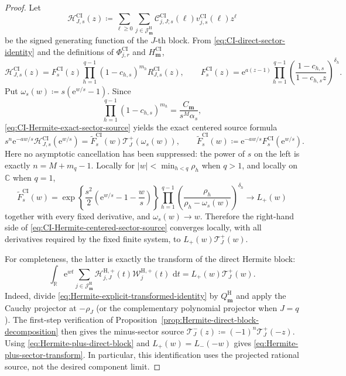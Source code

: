 \documentclass[10pt]{amsart}
\newcommand{\e}{\mathrm e}
\newcommand{\dd}{\,\mathrm d}
\newcommand{\mm}{\boldsymbol m}
\newcommand{\abs}[1]{\lvert#1\rvert}
\theoremstyle{plain}
\theoremstyle{definition}
\theoremstyle{remark}
\begin{document}
\begin{proof}
Let
\[
 \mathcal H_{J,s}^{\mathrm{CI}}(z)\coloneq
 \sum_{\ell\ge0}\sum_{j\in\mathcal J_{\mm}^{\mathrm H}}
 \mathscr C_{j,J;s}^{\mathrm{CI}}(\ell)
 v_{j,s}^{\mathrm{CI}}(\ell)z^\ell
\]
be the signed generating function of the \(J\)-th block.  From
\eqref{eq:CI-direct-sector-identity} and the definitions of
\(\Phi_{j,r}^{\mathrm{CI}}\) and \(H_{\mm}^{\mathrm{CI}}\),
\[
 \mathcal H_{J,s}^{\mathrm{CI}}(z)
 =F_s^{\mathrm{CI}}(z)
 \prod_{h=1}^{q-1}(1-c_{h,s})^{m_h}
 R_{J,s}^{\mathrm{CI}}(z),
 \qquad
 F_s^{\mathrm{CI}}(z)
 =\e^{a(z-1)}
 \prod_{h=1}^{q-1}
 \left(\frac{1-c_{h,s}}{1-c_{h,s}z}\right)^{\delta_h}.
\]
Put \(\omega_s(w)\coloneq s(\e^{w/s}-1)\).  Since
\[
 \prod_{h=1}^{q-1}(1-c_{h,s})^{m_h}
 =\frac{C_{\mm}}{s^M\alpha_s},
\]
\eqref{eq:CI-Hermite-exact-sector-source} yields the exact centered
source formula
\begin{equation}
 s^n\e^{-aw/s}
 \mathcal H_{J,s}^{\mathrm{CI}}(\e^{w/s})
 =
 \widetilde F_s^{\mathrm{CI}}(w)
 \mathcal T_J^+(\omega_s(w)),
 \qquad
 \widetilde F_s^{\mathrm{CI}}(w)
 \coloneq\e^{-aw/s}F_s^{\mathrm{CI}}(\e^{w/s}).
 \label{eq:CI-Hermite-centered-sector-source}
\end{equation}
Here no asymptotic cancellation has been suppressed: the power of \(s\)
on the left is exactly \(n=M+m_q-1\).  Locally for
\(\abs w<\min_{h<q}\rho_h\) when \(q>1\), and locally on
\(\mathbb C\) when \(q=1\),
\[
 \widetilde F_s^{\mathrm{CI}}(w)
 =
 \exp\!\left\{\frac{s^2}{2}
 \left(\e^{w/s}-1-\frac ws\right)\right\}
 \prod_{h=1}^{q-1}
 \left(\frac{\rho_h}{\rho_h-\omega_s(w)}\right)^{\delta_h}
 \longrightarrow L_+(w)
\]
together with every fixed derivative, and
\(\omega_s(w)\to w\).  Therefore the right-hand side of
\eqref{eq:CI-Hermite-centered-sector-source} converges locally, with
all derivatives required by the fixed finite system, to
\(L_+(w)\mathcal T_J^+(w)\).

For completeness, the latter is exactly the transform of the direct
Hermite block:
\begin{equation}
 \int_{\mathbb R}\e^{wt}
 \sum_{j\in\mathcal J_{\mm}^{\mathrm H}}
 \mathscr H_{j,J}^{\mathrm H,+}(t)
 \mathcal W_j^{\mathrm H,+}(t)\,\dd t
 =L_+(w)\mathcal T_J^+(w).
 \label{eq:Hermite-plus-sector-transform}
\end{equation}
Indeed, divide \eqref{eq:Hermite-explicit-transformed-identity} by
\(Q_{\mm}^{\mathrm H}\) and apply the Cauchy projector at
\(-\rho_J\) (or the complementary polynomial projector when \(J=q\)).
The first-step verification of
Proposition~\ref{prop:Hermite-direct-block-decomposition} then gives
the minus-sector source
\(\mathcal T_J^-(z)\coloneq(-1)^n\mathcal T_J^+(-z)\).
Using \eqref{eq:Hermite-plus-direct-block} and
\(L_+(w)=L_-(-w)\) gives
\eqref{eq:Hermite-plus-sector-transform}.  In particular, this
identification uses the projected rational source, not the desired
component limit.


\end{proof}
\end{document}

